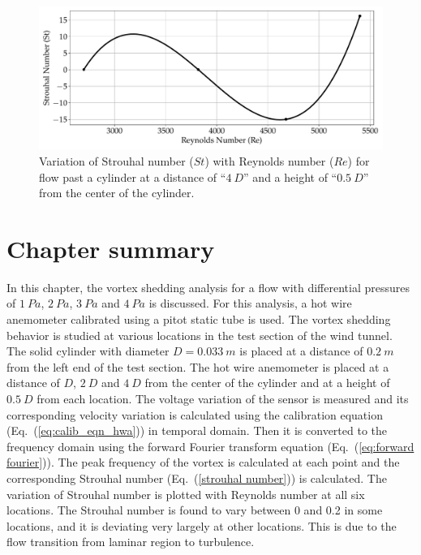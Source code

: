 \begin{figure}[H]
    \centering
    \includegraphics[width=\linewidth]{gfx/Re_vs_St_x_4D_y_0-5_D.pdf}
    \caption{Variation of Strouhal number ($St$) with Reynolds number ($Re$) for flow past a cylinder at a distance of \enquote{$4~D$} and a height of \enquote{$0.5~D$} from the center of the cylinder.}
    \label{fig:st_vs_re_x_4D_y_0-5_D}
\end{figure}

\section{Chapter summary}
In this chapter, the vortex shedding analysis for a flow with differential pressures of $1~Pa$, $2~Pa$, $3~Pa$ and $4~Pa$ is discussed. For this analysis, a hot wire anemometer calibrated using a pitot static tube is used. The vortex shedding behavior is studied at various locations in the test section of the wind tunnel. The solid cylinder with diameter $D = 0.033~m$ is placed at a distance of $0.2~m$ from the left end of the test section. The hot wire anemometer is placed at a distance of $D$, $2~D$ and $4~D$ from the center of the cylinder and at a height of $0.5~D$ from each location. The voltage variation of the sensor is measured and its corresponding velocity variation is calculated using the calibration equation (Eq.~(\ref{eq:calib_eqn_hwa})) in temporal domain. Then it is converted to the frequency domain using the forward Fourier transform equation (Eq.~(\ref{eq:forward fourier})). The peak frequency of the vortex is calculated at each point and the corresponding Strouhal number (Eq.~(\ref{strouhal number})) is calculated. The variation of Strouhal number is plotted with Reynolds number at all six locations. The Strouhal number is found to vary between 0 and 0.2 in some locations, and it is deviating very largely at other locations. This is due to the flow transition from laminar region to turbulence.